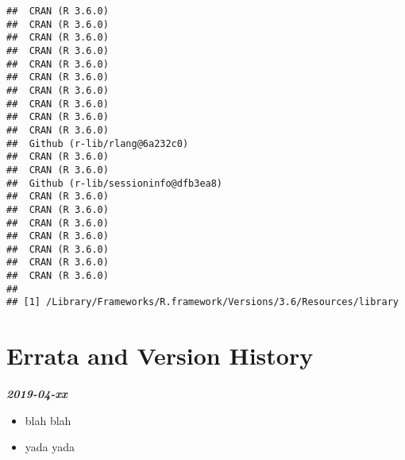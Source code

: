 \documentclass[11pt]{book}
\begin{document}
\begin{verbatim}
##  CRAN (R 3.6.0)                    
##  CRAN (R 3.6.0)                    
##  CRAN (R 3.6.0)                    
##  CRAN (R 3.6.0)                    
##  CRAN (R 3.6.0)                    
##  CRAN (R 3.6.0)                    
##  CRAN (R 3.6.0)                    
##  CRAN (R 3.6.0)                    
##  CRAN (R 3.6.0)                    
##  CRAN (R 3.6.0)                    
##  Github (r-lib/rlang@6a232c0)      
##  CRAN (R 3.6.0)                    
##  CRAN (R 3.6.0)                    
##  Github (r-lib/sessioninfo@dfb3ea8)
##  CRAN (R 3.6.0)                    
##  CRAN (R 3.6.0)                    
##  CRAN (R 3.6.0)                    
##  CRAN (R 3.6.0)                    
##  CRAN (R 3.6.0)                    
##  CRAN (R 3.6.0)                    
##  CRAN (R 3.6.0)                    
## 
## [1] /Library/Frameworks/R.framework/Versions/3.6/Resources/library
\end{verbatim}

\hypertarget{refs}{}

\hypertarget{errata-and-version-history}{%
\chapter*{Errata and Version History}\label{errata-and-version-history}}


\textbf{\emph{2019-04-xx}}

\begin{itemize}
\item
  blah blah
\item
  yada yada
\end{itemize}


\end{document}
